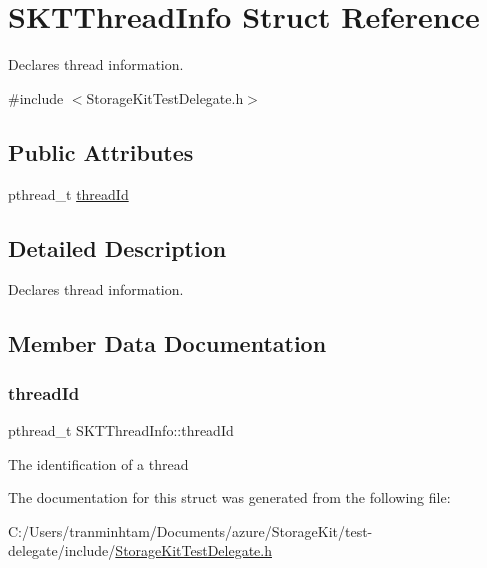 \hypertarget{struct_s_k_t_thread_info}{}\section{S\+K\+T\+Thread\+Info Struct Reference}
\label{struct_s_k_t_thread_info}


Declares thread information.  




{\ttfamily \#include $<$Storage\+Kit\+Test\+Delegate.\+h$>$}

\subsection*{Public Attributes}
\begin{DoxyCompactItemize}
\item 
pthread\+\_\+t \mbox{\hyperlink{struct_s_k_t_thread_info_a3979a02ba2be6d3b92c53dcceaf2f156}{thread\+Id}}
\end{DoxyCompactItemize}


\subsection{Detailed Description}
Declares thread information. 

\subsection{Member Data Documentation}
\mbox{\label{struct_s_k_t_thread_info_a3979a02ba2be6d3b92c53dcceaf2f156}} 
\subsubsection{\texorpdfstring{threadId}{threadId}}
{\footnotesize\ttfamily pthread\+\_\+t S\+K\+T\+Thread\+Info\+::thread\+Id}

The identification of a thread 

The documentation for this struct was generated from the following file\+:\begin{DoxyCompactItemize}
\item 
C\+:/\+Users/tranminhtam/\+Documents/azure/\+Storage\+Kit/test-\/delegate/include/\mbox{\hyperlink{_storage_kit_test_delegate_8h}{Storage\+Kit\+Test\+Delegate.\+h}}\end{DoxyCompactItemize}
